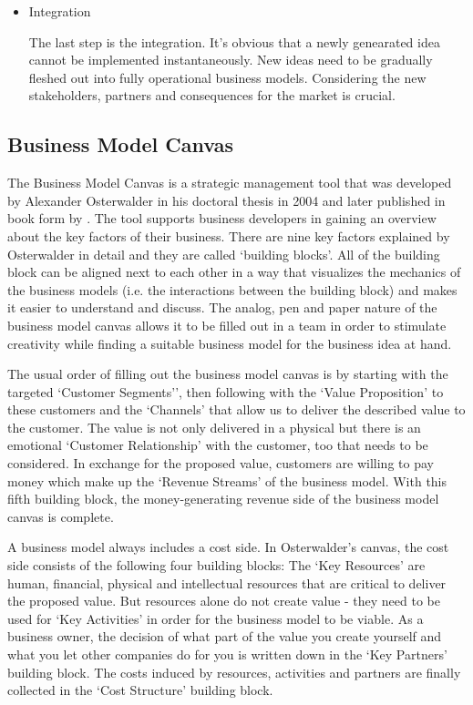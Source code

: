 \begin{itemize}
\begin{itemize}
\begin{itemize}
					 \item Integration

					The last step is the integration. It's obvious that a newly genearated idea cannot be implemented instantaneously. New ideas need to be gradually fleshed out into fully operational business models. Considering the new stakeholders, partners and consequences for the market is crucial.


				\end{itemize}
			\end{itemize}
		\end{itemize}	
	\subsection{Business Model Canvas} 
		The Business Model Canvas is a strategic management tool that was developed by Alexander Osterwalder in his doctoral thesis in 2004 and later published in book form by \cite{osterwalder}. The tool supports business developers in gaining an overview about the key factors of their business. There are nine key factors explained by Osterwalder in detail and they are called `building blocks'. All of the building block can be aligned next to each other in a way that visualizes the mechanics of the business models (i.e. the interactions between the building block) and makes it easier to understand and discuss. The analog, pen and paper nature of the business model canvas allows it to be filled out in a team in order to stimulate creativity while finding a suitable business model for the business idea at hand.

		The usual order of filling out the business model canvas \cite{bmc} is by starting with the targeted `Customer Segments'', then following with the `Value Proposition' to these customers and the `Channels' that allow us to deliver the described value to the customer. The value is not only delivered in a physical but there is an emotional `Customer Relationship' with the customer, too that needs to be considered. In exchange for the proposed value, customers are willing to pay money which make up the `Revenue Streams' of the business model. With this fifth building block, the money-generating revenue side of the business model canvas is complete.

		A business model always includes a cost side. In Osterwalder's canvas, the cost side consists of the following four building blocks: The `Key Resources' are human, financial, physical and intellectual resources that are critical to deliver the proposed value. But resources alone do not create value - they need to be used for `Key Activities' in order for the business model to be viable. As a business owner, the decision of what part of the value you create yourself and what you let other companies do for you is written down in the `Key Partners' building block. The costs induced by resources, activities and partners are finally collected in the `Cost Structure' building block.

